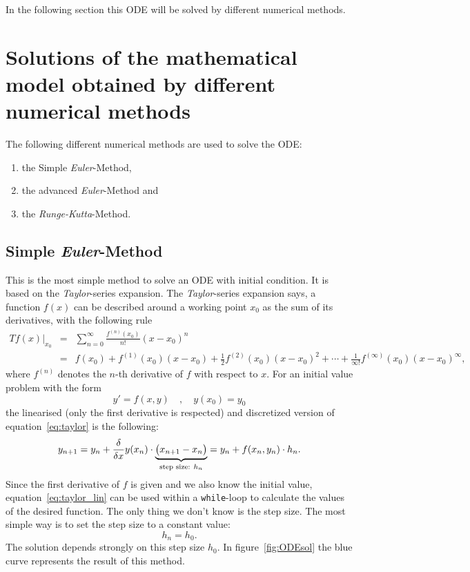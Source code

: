 \documentclass[11pt,a4paper,oneside]{scrartcl}
\begin{document}
In the following section this ODE will be solved by different numerical methods.


\section{Solutions of the mathematical model obtained by different numerical methods}

The following different numerical methods are used to solve the ODE:
\begin{enumerate}
    \item the Simple \textit{Euler}-Method,
    \item the advanced \textit{Euler}-Method and
    \item the \textit{Runge-Kutta}-Method.
\end{enumerate}

\subsection{Simple \textit{Euler}-Method}
This is the most simple method to solve an ODE with initial condition. It is based on the \textit{Taylor}-series expansion. The \textit{Taylor}-series expansion says, a function $f(x)$ can be described around a working point $x_0$ as the sum of its derivatives, with the following rule
\begin{eqnarray}
        Tf(x)\bigg|_{x_0} &=&    \sum\limits_{n=0}^{\infty}\frac{f^{(n)}(x_0)}{n!}(x-x_0)^n \\
        &=& f(x_0) + f^{(1)}(x_0)(x-x_0) + \frac{1}{2}f^{(2)}(x_0)(x-x_0)^2 + \cdots + \frac{1}{\infty!}f^{(\infty)}(x_0)(x-x_0)^\infty , \label{eq:taylor}
\end{eqnarray}
where $f^{(n)}$ denotes the $n$-th derivative of $f$ with respect to $x$.
For an initial value problem with the form 
$$y' = f(x,y) \quad , \quad y(x_0) = y_0$$
the linearised (only the first derivative is respected) and discretized version of equation~\ref{eq:taylor} is the following:
\begin{equation}
    y_{n+1} = y_n + \frac{\delta}{\delta x}y(x_n)\cdot \underbrace{ \big(x_{n+1}-x_n\big) }_{\textnormal{step size: } h_n} = y_n + f(x_n,y_n) \cdot  h_n.
    \label{eq:taylor_lin}
\end{equation}
Since the first derivative of $f$ is given and we also know the initial value, equation~\ref{eq:taylor_lin} can be used within a \texttt{while}-loop to calculate the values of the desired function. The only thing we don't know is the step size. The most simple way is to set the step size to a constant value:
$$h_n=h_0 .$$
The solution depends strongly on this step size $h_0$. In figure~\ref{fig:ODEsol} the blue curve represents the result of this method.
\end{document}
